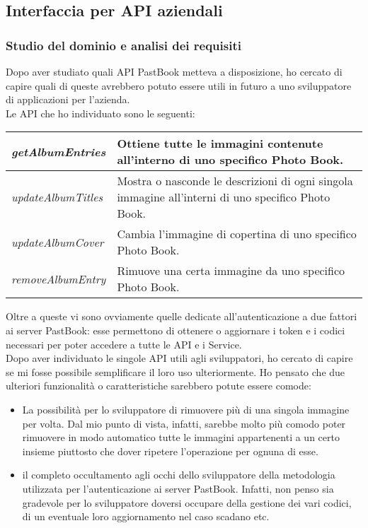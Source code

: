 		\subsection{Interfaccia per API aziendali}
			\subsubsection{Studio del dominio e analisi dei requisiti}
				Dopo aver studiato quali API PastBook metteva a disposizione, ho cercato di capire quali di queste avrebbero potuto
				essere utili in futuro a uno sviluppatore di applicazioni per l'azienda.\\
				Le API che ho individuato sono le seguenti:
				\begin{center}
					\begin{tabular}[H]{p{} p{}}
						\emph{getAlbumEntries}		& Ottiene tutte le immagini contenute all'interno di uno specifico
										  Photo Book.\\
						\hline
						\emph{updateAlbumTitles}	& Mostra o nasconde le descrizioni di ogni singola immagine
										  all'interni di uno specifico Photo Book.\\
						\hline
						\emph{updateAlbumCover}		& Cambia l'immagine di copertina di uno specifico Photo Book.\\
						\hline
						\emph{removeAlbumEntry}		& Rimuove una certa immagine da uno specifico Photo Book.\\
					\end{tabular}
				\end{center}
				Oltre a queste vi sono ovviamente quelle dedicate all'autenticazione a due fattori ai server PastBook: esse
				permettono di ottenere o aggiornare i token e i codici necessari per poter accedere a tutte le API e i Service.\\
				Dopo aver individuato le singole API utili agli sviluppatori, ho cercato di capire se mi fosse possibile semplificare
				il loro uso ulteriormente. Ho pensato che due ulteriori funzionalità o caratteristiche sarebbero potute essere
				comode:
				\begin{itemize}
					\item La possibilità per lo sviluppatore di rimuovere più di una singola immagine per volta. Dal mio punto di
					vista, infatti, sarebbe molto più comodo poter rimuovere in modo automatico tutte le immagini appartenenti a
					un certo insieme piuttosto che dover ripetere l'operazione per ognuna di esse.
					\item il completo occultamento agli occhi dello sviluppatore della metodologia utilizzata per
					l'autenticazione ai server PastBook. Infatti, non penso sia gradevole per lo sviluppatore doversi occupare
					della gestione dei vari codici, di un eventuale loro aggiornamento nel caso scadano etc.
				\end{itemize}
